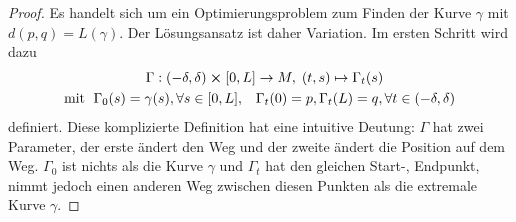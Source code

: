 \begin{proof}
Es handelt sich um ein Optimierungsproblem zum Finden der Kurve $\gamma$ mit $d(p, q) = L(\gamma)$. Der Lösungsansatz ist daher Variation. Im ersten Schritt wird dazu
\begin{align*}
\Gamma: (-\delta, \delta) \cross [0, L] &\rightarrow M, \; (t, s) \mapsto \Gamma_t(s)
\\
\text{mit } \; \Gamma_0(s) = \gamma(s), \forall s \in [0, L], \quad &\Gamma_t(0) = p, \Gamma_t(L) = q, \forall t \in (-\delta, \delta)
\end{align*}
definiert. Diese komplizierte Definition hat eine intuitive Deutung: $\Gamma$ hat zwei Parameter, der erste ändert den Weg und der zweite ändert die Position auf dem Weg. $\Gamma_0$ ist nichts als die Kurve $\gamma$ und $\Gamma_t$ hat den gleichen Start-, Endpunkt, nimmt jedoch einen anderen Weg zwischen diesen Punkten als die extremale Kurve $\gamma$.


\end{proof}
